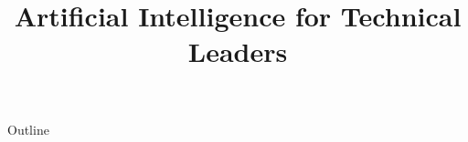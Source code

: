 \documentclass[xcolor=dvipsnames,compress,t,pdf,notes,9pt]{beamer}
\title[\insertframenumber /\inserttotalframenumber]{Artificial Intelligence for Technical Leaders}
\begin{document}
	\begin{frame}
	\titlepage
	\end{frame}
	
	\begin{frame}{Outline}
	    \tableofcontents
	\end{frame}

	
	
	
\end{document}
